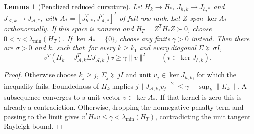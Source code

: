 \documentclass[pdflatex,sn-mathphys-num]{sn-jnl}
\theoremstyle{thmstyleone}
\newtheorem{lemma}[theorem]{Lemma}
\theoremstyle{thmstylethree}
\begin{document}
\begin{lemma}[Penalized reduced curvature]\label{lem:debreu}
Let $H_k\to H_*$, $J_{h,k}\to J_{h,*}$ and
$J_{\mathcal A,k}\to J_{\mathcal A,*}$, with
$A_*=[J_{h,*}^T,J_{\mathcal A,*}^T]^T$ of full row rank.
Let $Z$ span $\ker A_*$ orthonormally.
If this space is nonzero and $H_T=Z^TH_*Z\succ0$, choose
$0<\gamma<\lambda_{\min}(H_T)$.
If $\ker A_*=\{0\}$, choose any finite $\gamma>0$ instead.
Then there are $\bar\sigma>0$ and $k_1$ such that, for every
$k\geq k_1$ and every diagonal $\Sigma\succeq\bar\sigma I$,
\[
 v^T(H_k+J_{\mathcal A,k}^T\Sigma J_{\mathcal A,k})v
 \geq\gamma\|v\|^2\qquad(v\in\ker J_{h,k}).
\]
\end{lemma}
\begin{proof}
Otherwise choose $k_j\geq j$, $\Sigma_j\succeq jI$ and unit
$v_j\in\ker J_{h,k_j}$ for which the inequality fails.
Boundedness of $H_k$ implies
$j\|J_{\mathcal A,k_j}v_j\|^2\leq\gamma+\sup_k\|H_k\|$.
A subsequence converges to a unit vector $\bar v\in\ker A_*$.
If that kernel is zero this is already a contradiction.
Otherwise, dropping the nonnegative penalty term and passing to the
limit gives
$\bar v^TH_*\bar v\leq\gamma<\lambda_{\min}(H_T)$,
contradicting the unit tangent Rayleigh bound.
\end{proof}
\end{document}
